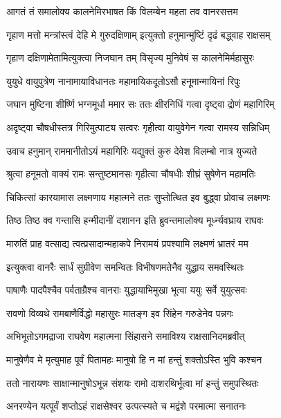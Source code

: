 \twolineshloka
{आगतं तं समालोक्य कालनेमिरभाषत}
{किं विलम्बेन महता तव वानरसत्तम} %

\twolineshloka
{गृहाण मत्तो मन्त्रांस्त्वं देहि मे गुरुदक्षिणाम्}
{इत्युक्तो हनुमान्मुष्टिं दृढं बद्ध्वाह राक्षसम्} %

\twolineshloka
{गृहाण दक्षिणामेतामित्युक्त्वा निजघान तम्}
{विसृज्य मुनिवेषं स कालनेमिर्महासुरः} %

\twolineshloka
{युयुधे वायुपुत्रेण नानामायाविधानतः}
{महामायिकदूतोऽसौ हनूमान्मायिनां रिपुः} %

\twolineshloka
{जघान मुष्टिना शीर्ष्णि भग्नमूर्धा ममार सः}
{ततः क्षीरनिधिं गत्वा दृष्ट्वा द्रोणं महागिरिम्} %

\twolineshloka
{अदृष्ट्वा चौषधीस्तत्र गिरिमुत्पाट्य सत्वरः}
{गृहीत्वा वायुवेगेन गत्वा रामस्य सन्निधिम्} %

\twolineshloka
{उवाच हनुमान् राममानीतोऽयं महागिरिः}
{यद्युक्तं कुरु देवेश विलम्बो नात्र युज्यते} %

\twolineshloka
{श्रुत्वा हनूमतो वाक्यं रामः सन्तुष्टमानसः}
{गृहीत्वा चौषधीः शीघ्रं सुषेणेन महामतिः} %

\twolineshloka
{चिकित्सां कारयामास लक्ष्मणाय महात्मने}
{ततः सुप्तोत्थित इव बुद्ध्वा प्रोवाच लक्ष्मणः} %

\twolineshloka
{तिष्ठ तिष्ठ क्व गन्तासि हन्मीदानीं दशानन}
{इति ब्रुवन्तमालोक्य मूर्ध्न्यवघ्राय राघवः} %

\twolineshloka
{मारुतिं प्राह वत्साद्य त्वत्प्रसादान्महाकपे}
{निरामयं प्रपश्यामि लक्ष्मणं भ्रातरं मम} %

\twolineshloka
{इत्युक्त्वा वानरैः सार्धं सुग्रीवेण समन्वितः}
{विभीषणमतेनैव युद्धाय समवस्थितः} %

\twolineshloka
{पाषाणैः पादपैश्चैव पर्वताग्रैश्च वानराः}
{युद्धायाभिमुखा भूत्वा ययुः सर्वे युयुत्सवः} %

\twolineshloka
{रावणो विव्यथे रामबाणैर्विद्धो महासुरः}
{मातङ्ग इव सिंहेन गरुडेनेव पन्नगः} %

\twolineshloka
{अभिभूतोऽगमद्राजा राघवेण महात्मना}
{सिंहासने समाविश्य राक्षसानिदमब्रवीत्} %

\twolineshloka
{मानुषेणैव मे मृत्युमाह पूर्वं पितामहः}
{मानुषो हि न मां हन्तुं शक्तोऽस्ति भुवि कश्चन} %

\twolineshloka
{ततो नारायणः साक्षान्मानुषोऽभून्न संशयः}
{रामो दाशरथिर्भूत्वा मां हन्तुं समुपस्थितः} %

\twolineshloka
{अनरण्येन यत्पूर्वं शप्तोऽहं राक्षसेश्वर}
{उत्पत्स्यते च मद्वंशे परमात्मा सनातनः} %

